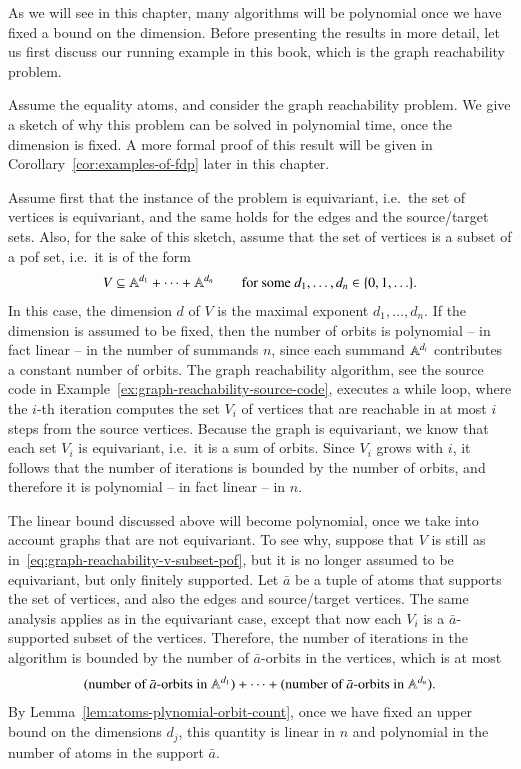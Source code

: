 As we will see in this chapter, many algorithms will be polynomial once we have fixed a bound on the dimension. Before presenting the results in more detail, let us first discuss our running example in this book, which is the graph reachability problem.
\begin{myexample}\label{ex:graph-fdp}
    Assume the equality atoms, and  consider the  graph reachability problem. We give a sketch of why this problem can be solved in polynomial time, once the  dimension is fixed. A more formal proof of this result will be given in Corollary~\ref{cor:examples-of-fdp} later in this chapter.


    Assume first that the instance of the problem is equivariant, i.e.~the set of vertices is equivariant, and the same holds for the edges and the source/target sets. Also, for the sake of this sketch,  assume that the set of vertices is a subset of a pof set, i.e.~it is of the form 
\begin{align}\label{eq:graph-reachability-v-subset-pof}
V \subseteq  \mathbb A^{d_1} + \cdots + \mathbb A^{d_n} \qquad \text{for some $d_1,\ldots,d_n \in \{0,1,\ldots\}$}.
\end{align}
In this case, the dimension $d$ of $V$ is the maximal exponent $d_1,\ldots,d_n$. If the dimension is assumed to be fixed, then the number of orbits is polynomial -- in fact linear -- in the number of summands $n$, since each summand $\mathbb A^{d_i}$ contributes a constant number of orbits. The graph reachability algorithm, see the source code in Example~\ref{ex:graph-reachability-source-code}, executes a while loop, where the $i$-th iteration computes the set $V_i$ of vertices that are  reachable in at most $i$ steps from the source vertices. Because the graph is equivariant, we know that each set $V_i$ is equivariant, i.e.~it is a sum of orbits. Since $V_i$ grows with $i$, it follows that the number of iterations is bounded by the number of orbits, and therefore it is polynomial -- in fact linear -- in $n$. 

The linear bound discussed above will become polynomial, once we take into account graphs that are not equivariant. To see why, suppose that $V$ is still as in~\eqref{eq:graph-reachability-v-subset-pof}, but it is no longer assumed to be equivariant, but only finitely supported. Let $\bar a$ be a tuple of   atoms that supports the set of vertices, and also the edges and source/target vertices. The same analysis applies as in the equivariant case, except that now  each $V_i$ is a $\bar a$-supported subset of the vertices. Therefore, the number of iterations in the algorithm is bounded by the number of $\bar a$-orbits in the vertices, which is at most 
\begin{align*}
 \text{(number of $\bar a$-orbits in $\mathbb A^{d_1}$)}
 + \cdots + 
    \text{(number of $\bar a$-orbits in $\mathbb A^{d_n}$)}.
\end{align*}
By Lemma~\ref{lem:atoms-plynomial-orbit-count}, once we have fixed an upper bound on the dimensions $d_j$, this quantity is linear in $n$ and polynomial in the number of atoms in the support $\bar a$. 
\end{myexample} 


